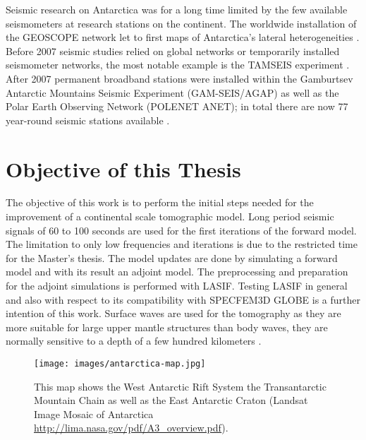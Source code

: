 Seismic research on Antarctica was for a long time limited by the few available seismometers at research stations on the continent. 
The worldwide installation of the GEOSCOPE network let to first maps of Antarctica's lateral heterogeneities \citep{Roult1994}.
Before 2007 seismic studies relied on global networks or temporarily installed seismometer networks, the most notable
example is the TAMSEIS experiment \citep{Lawrence2006}. 
After 2007 permanent broadband stations were installed within the Gamburtsev Antarctic Mountains Seismic Experiment (GAM-SEIS/AGAP)
as well as the Polar Earth Observing Network (POLENET ANET); 
in total there are now 77 year-round seismic stations available \citep{Anthony2014}.  


\section{Objective of this Thesis} %

The objective of this work is to perform the initial steps needed for the improvement of a continental scale tomographic model.
Long period seismic signals of 60 to 100 seconds %
are used for the first iterations of the forward model. 
The limitation to only low frequencies and %
iterations is due to the restricted time for the Master's thesis.
The model updates are done by simulating a forward model and with its result an adjoint model. %
The preprocessing and preparation for the adjoint simulations is performed with LASIF. 
Testing LASIF in general and also with respect to its compatibility with SPECFEM3D GLOBE is a further intention of this work.
Surface waves are used for the tomography as they are more suitable for large upper mantle structures than body waves, 
they are normally sensitive to a depth of a few hundred kilometers \citep{Morelli2004}.

 


\begin{figure}[H]
\begin{center}
\texttt{[image: images/antarctica-map.jpg]}
\caption{This map shows the West Antarctic Rift System the Transantarctic Mountain Chain as well as the East Antarctic Craton 
(Landsat Image Mosaic of Antarctica \url{http://lima.nasa.gov/pdf/A3_overview.pdf}).}
\label{ant-map}
\end{center}
\end{figure}